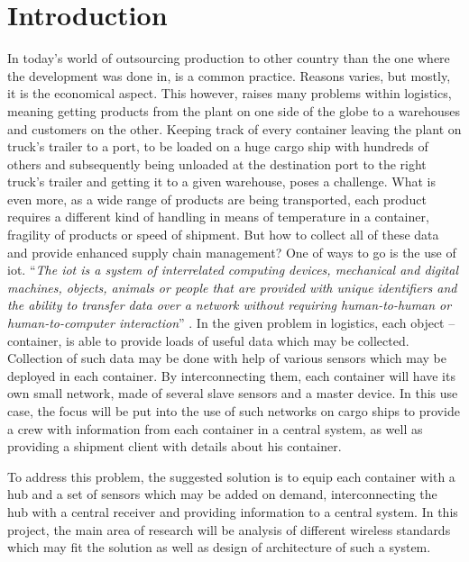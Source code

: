 \section{Introduction}
% 
In today’s world of outsourcing production to other country than the one where the development was done in, is a common practice. Reasons varies, but mostly, it is the economical aspect. This however, raises many problems within logistics, meaning getting products from the plant on one side of the globe to a warehouses and customers on the other. Keeping track of every container leaving the plant on truck’s trailer to a port, to be loaded on a huge cargo ship with hundreds of others and subsequently being unloaded at the destination port to the right truck’s trailer and getting it to a given warehouse, poses a challenge. What is even more, as a wide range of products are being transported, each product requires a different kind of handling in means of temperature in a container, fragility of products or speed of shipment. But how to collect all of these data and provide enhanced supply chain management?
One of ways to go is the use of \acrshort{iot}\footnotemark. ``\textit{The \acrfull{iot} is a system of interrelated computing devices, mechanical and digital machines, objects, animals or people that are provided with unique identifiers and the ability to transfer data over a network without requiring human-to-human or human-to-computer interaction}'' \cite{MargaretRouse2016WhatWhatIs.com}. In the given problem in logistics, each object – container, is able to provide loads of useful data which may be collected. Collection of such data may be done with help of various sensors which may be deployed in each container. By interconnecting them, each container will have its own small network, made of several slave sensors and a master device. In this use case, the focus will be put into the use of such networks on cargo ships to provide a crew with information from each container in a central system, as well as providing a shipment client with details about his container.
% 

To address this problem, the suggested solution is to equip each container with a hub and a set of sensors which may be added on demand, interconnecting the hub with a central receiver and providing information to a central system. In this project, the main area of research will be analysis of different wireless standards which may fit the solution as well as design of architecture of such a system.

